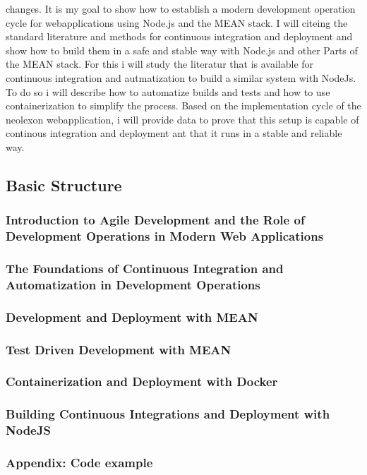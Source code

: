 changes. It is my goal to show how to establish a modern development operation cycle for webapplications using Node.js and the MEAN stack.
I will citeing the standard literature and methods for continuous integration and deployment and show how to build them in a safe and stable
way with Node.js and other Parts of the MEAN stack.
For this i will study the literatur that is available for continuous integration and autmatization to build a similar system with NodeJs.
To do so i will describe how to automatize builds and tests and how to use containerization to simplify the process. Based on the
implementation cycle of the neolexon webapplication, i will provide data to prove that this setup is capable of continous integration and deployment
ant that it runs in a stable and reliable way.

\subsection{Basic Structure}
\subsubsection{Introduction to Agile Development and the Role of Development Operations in Modern Web Applications}
\subsubsection{The Foundations of Continuous Integration and Automatization in Development Operations}
\subsubsection{Development and Deployment with MEAN}
\subsubsection{Test Driven Development with MEAN}
\subsubsection{Containerization and Deployment with Docker}
\subsubsection{Building Continuous Integrations and Deployment with NodeJS}
\subsubsection{Appendix: Code example}

